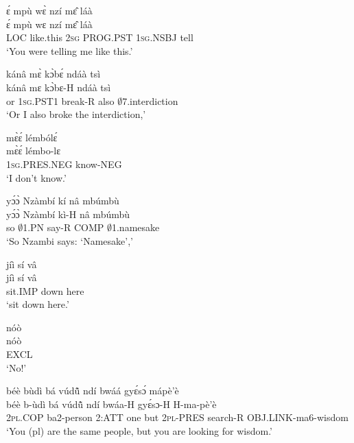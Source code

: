 \begin{exe} 
\exN\label{220}
  \glll ɛ́ mpù wɛ̀ nzí mɛ̂ láà \\
       ɛ́ mpù wɛ nzí mɛ̂ láà \\
       LOC like.this 2\textsc{sg} PROG.PST 1\textsc{sg}.NSBJ tell   \\
    \trans `You were telling me like this.'
\end{exe}

\begin{exe} 
\exN\label{221}
  \glll kánâ mɛ̀ kɔ̀bɛ́ ndáà tsì \\
        kánâ mɛ kɔ̀bɛ-H ndáà tsì \\
        or 1\textsc{sg}.PST1 break-R also $\emptyset$7.interdiction  \\
    \trans `Or I also broke the interdiction,'
\end{exe}

\begin{exe} 
\exN\label{222}
  \glll mɛ̀ɛ́ lémbólɛ́ \\
        mɛ̀ɛ́ lémbo-lɛ \\
        1\textsc{sg}.PRES.NEG know-NEG  \\
    \trans `I don't know.'
\end{exe}

\begin{exe} 
\exN\label{223}
  \glll yɔ́ɔ̀ Nzàmbí kí nâ mbúmbù \\
        yɔ́ɔ̀ Nzàmbí kì-H nâ mbúmbù \\
         so $\emptyset$1.PN say-R COMP $\emptyset$1.namesake \\
    \trans `So Nzambi says: `Namesake','
\end{exe}

\begin{exe} 
\exN\label{224}
  \glll jíì sí vâ \\
        jíì sí vâ \\
         sit.IMP down here \\
    \trans `sit down here.'
\end{exe}

\begin{exe} 
\exN\label{225}
  \glll nóò \\
        nóò \\
         EXCL \\
    \trans `No!'
\end{exe}

\begin{exe} 
\exN\label{226}
  \glll béè bùdì bá vúdũ̂ ndí bwáá gyɛ́sɔ́ mápè'è\\
        béè b-ùdì bá vúdũ̂ ndí bwáa-H gyɛ́sɔ-H H-ma-pè'è\\
         2\textsc{pl}.COP ba2-person 2:ATT one but 2\textsc{pl}-PRES search-R OBJ.LINK-ma6-wisdom\\
    \trans `You (pl) are the same people, but you are looking for wisdom.'
\end{exe}

